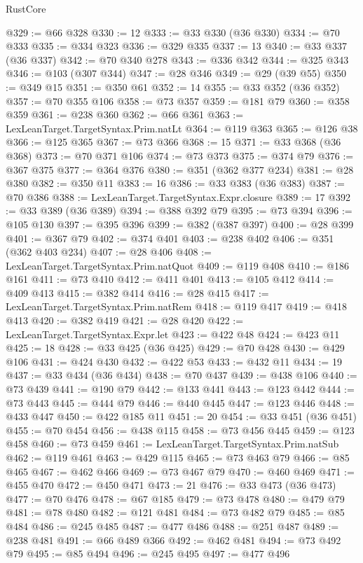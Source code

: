 \begin{lexlean}{RustCore}
\begin{coremodule}
@329 := @66 @328
@330 := 12
@333 := @33 @330 (@36 @330)
@334 := @70 @333
@335 := @334 @323
@336 := @329 @335
@337 := 13
@340 := @33 @337 (@36 @337)
@342 := @70 @340 @278
@343 := @336 @342
@344 := @325 @343
@346 := @103 (@307 @344)
@347 := @28 @346
@349 := @29 (@39 @55)
@350 := @349 @15
@351 := @350 @61
@352 := 14
@355 := @33 @352 (@36 @352)
@357 := @70 @355 @106
@358 := @73 @357
@359 := @181 @79
@360 := @358 @359
@361 := @238 @360
@362 := @66 @361
@363 := LexLeanTarget.TargetSyntax.Prim.natLt
@364 := @119 @363
@365 := @126 @38
@366 := @125 @365
@367 := @73 @366
@368 := 15
@371 := @33 @368 (@36 @368)
@373 := @70 @371 @106
@374 := @73 @373
@375 := @374 @79
@376 := @367 @375
@377 := @364 @376
@380 := @351 (@362 @377 @234)
@381 := @28 @380
@382 := @350 @11
@383 := 16
@386 := @33 @383 (@36 @383)
@387 := @70 @386
@388 := LexLeanTarget.TargetSyntax.Expr.closure
@389 := 17
@392 := @33 @389 (@36 @389)
@394 := @388 @392 @79
@395 := @73 @394
@396 := @105 @130
@397 := @395 @396
@399 := @382 (@387 @397)
@400 := @28 @399
@401 := @367 @79
@402 := @374 @401
@403 := @238 @402
@406 := @351 (@362 @403 @234)
@407 := @28 @406
@408 := LexLeanTarget.TargetSyntax.Prim.natQuot
@409 := @119 @408
@410 := @186 @161
@411 := @73 @410
@412 := @411 @401
@413 := @105 @412
@414 := @409 @413
@415 := @382 @414
@416 := @28 @415
@417 := LexLeanTarget.TargetSyntax.Prim.natRem
@418 := @119 @417
@419 := @418 @413
@420 := @382 @419
@421 := @28 @420
@422 := LexLeanTarget.TargetSyntax.Expr.let
@423 := @422 @48
@424 := @423 @11
@425 := 18
@428 := @33 @425 (@36 @425)
@429 := @70 @428
@430 := @429 @106
@431 := @424 @430
@432 := @422 @53
@433 := @432 @11
@434 := 19
@437 := @33 @434 (@36 @434)
@438 := @70 @437
@439 := @438 @106
@440 := @73 @439
@441 := @190 @79
@442 := @133 @441
@443 := @123 @442
@444 := @73 @443
@445 := @444 @79
@446 := @440 @445
@447 := @123 @446
@448 := @433 @447
@450 := @422 @185 @11
@451 := 20
@454 := @33 @451 (@36 @451)
@455 := @70 @454
@456 := @438 @115
@458 := @73 @456 @445
@459 := @123 @458
@460 := @73 @459
@461 := LexLeanTarget.TargetSyntax.Prim.natSub
@462 := @119 @461
@463 := @429 @115
@465 := @73 @463 @79
@466 := @85 @465
@467 := @462 @466
@469 := @73 @467 @79
@470 := @460 @469
@471 := @455 @470
@472 := @450 @471
@473 := 21
@476 := @33 @473 (@36 @473)
@477 := @70 @476
@478 := @67 @185
@479 := @73 @478
@480 := @479 @79
@481 := @78 @480
@482 := @121 @481
@484 := @73 @482 @79
@485 := @85 @484
@486 := @245 @485
@487 := @477 @486
@488 := @251 @487
@489 := @238 @481
@491 := @66 @489 @366
@492 := @462 @481
@494 := @73 @492 @79
@495 := @85 @494
@496 := @245 @495
@497 := @477 @496

\end{coremodule}
\end{lexlean}
